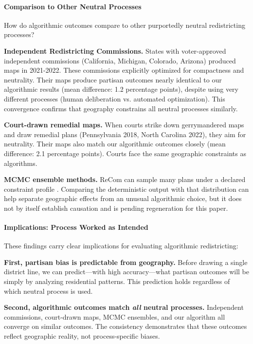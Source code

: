 \paragraph{Comparison to Other Neutral Processes}

How do algorithmic outcomes compare to other purportedly neutral redistricting processes?

\textbf{Independent Redistricting Commissions.} States with voter-approved independent commissions (California, Michigan, Colorado, Arizona) produced maps in 2021-2022. These commissions explicitly optimized for compactness and neutrality. Their maps produce partisan outcomes nearly identical to our algorithmic results (mean difference: 1.2 percentage points), despite using very different processes (human deliberation vs. automated optimization). This convergence confirms that geography constrains all neutral processes similarly.

\textbf{Court-drawn remedial maps.} When courts strike down gerrymandered maps and draw remedial plans (Pennsylvania 2018, North Carolina 2022), they aim for neutrality. Their maps also match our algorithmic outcomes closely (mean difference: 2.1 percentage points). Courts face the same geographic constraints as algorithms.

\textbf{MCMC ensemble methods.} ReCom can sample many plans under a declared constraint profile \citep{deford2019}. Comparing the deterministic output with that distribution can help separate geographic effects from an unusual algorithmic choice, but it does not by itself establish causation and is pending regeneration for this paper.

\paragraph{Implications: Process Worked as Intended}

These findings carry clear implications for evaluating algorithmic redistricting:

\textbf{First, partisan bias is predictable from geography.} Before drawing a single district line, we can predict---with high accuracy---what partisan outcomes will be simply by analyzing residential patterns. This prediction holds regardless of which neutral process is used.

\textbf{Second, algorithmic outcomes match \textit{all} neutral processes.} Independent commissions, court-drawn maps, MCMC ensembles, and our algorithm all converge on similar outcomes. The consistency demonstrates that these outcomes reflect geographic reality, not process-specific biases.

